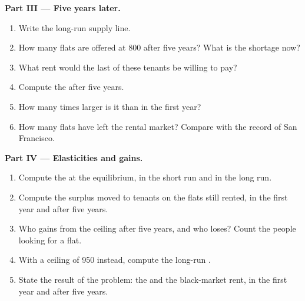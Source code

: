 \begin{problem}
\medskip
\noindent\textbf{Part III --- Five years later.}
\begin{enumerate}[resume]
\item Write the long-run supply line.
\item How many flats are offered at 800 after five years? What is the shortage now?
\item What rent would the last of these tenants be willing to pay?
\item Compute the  after five years.
\item How many times larger is it than in the first year?
\item How many flats have left the rental market? Compare with the record of San Francisco.
\end{enumerate}

\medskip
\noindent\textbf{Part IV --- Elasticities and gains.}
\begin{enumerate}[resume]
\item Compute the  at the equilibrium, in the short run and in the long run.
\item Compute the surplus moved to tenants on the flats still rented, in the first year and after five years.
\item Who gains from the ceiling after five years, and who loses? Count the people looking for a flat.
\item With a ceiling of 950 instead, compute the long-run .
\item State the result of the problem: the  and the black-market rent, in the first year and after five years.
\end{enumerate}
\end{problem}

